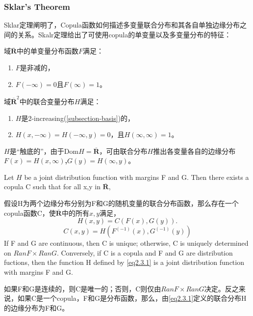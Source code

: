 \subsubsection{Sklar's Theorem}\cite{Bill2000An}
Sklar定理阐明了，Copula函数如何描述多变量联合分布和其各自单独边缘分布之间的关系。Skalr定理给出了可使用copula的单变量以及多变量分布的特征：
\begin{definition}
    域$\overline{\mathbf{R}}$中的单变量分布函数$F$满足：
    \begin{enumerate}
        \item $F$是非减的，
        \item $F(-\infty) = 0$且$F(\infty) = 1$。
    \end{enumerate}
    \label{def2.3.1}
\end{definition}

\begin{definition}
    域$\overline{\mathbf{R}}^2$中的联合变量分布$H$满足：
    \begin{enumerate}
        \item $H$是2-increasing(\cref{subsection-basis})的，
        \item $H(x,-\infty) = H(-\infty,y) = 0$，且$H(\infty,\infty) = 1$。
    \end{enumerate}
    $H$是``触底的''，由于Dom$H = \overline{\mathbf{R}}$，可由联合分布$H$推出各变量各自的边缘分布\textbf{\textcolor[rgb]{1,0,0}{$F(x) = H(x,\infty)$,$G(y) = H(\infty,y)$}}。
    \label{def2.3.2}
\end{definition}

\begin{theorem}[\textbf{\textcolor[rgb]{1,0,0}{Sklar's Theorem}}]
    Let $H$ be a joint distribution function with margins F and G. Then there exists a copula C such that for all x,y in $\overline{\mathbf{R}}$,

    假设H为两个边缘分布分别为F和G的随机变量的联合分布函数，那么存在一个copula函数C，使$\overline{\mathbf{R}}$中的所有$x,y$满足，
    \begin{equation}
        H(x,y) = C(F(x),G(y)).
        \label{eq2.3.1}
    \end{equation}
    \begin{equation}
        C(x,y) = H(F^{(-1)}(x),G^{(-1)}(y))
        \label{eq2.3.3}
    \end{equation}
    If F and G are continuous, then C is unique; otherwise, C is uniquely determined on $RanF\times RanG$. Conversely, if C is a copula and F and G are distribution fuctions, then the function H defined by \cref{eq2.3.1} is a joint distribution function with margins F and G.
   
    如果F和G是连续的，则C是唯一的；否则，C则仅由$RanF\times RanG$决定。反之来说，如果C是一个copula，F和G是分布函数，那么，由\cref{eq2.3.1}定义的联合分布H的边缘分布为F和G。
    \label{thr-sklar}
\end{theorem}

